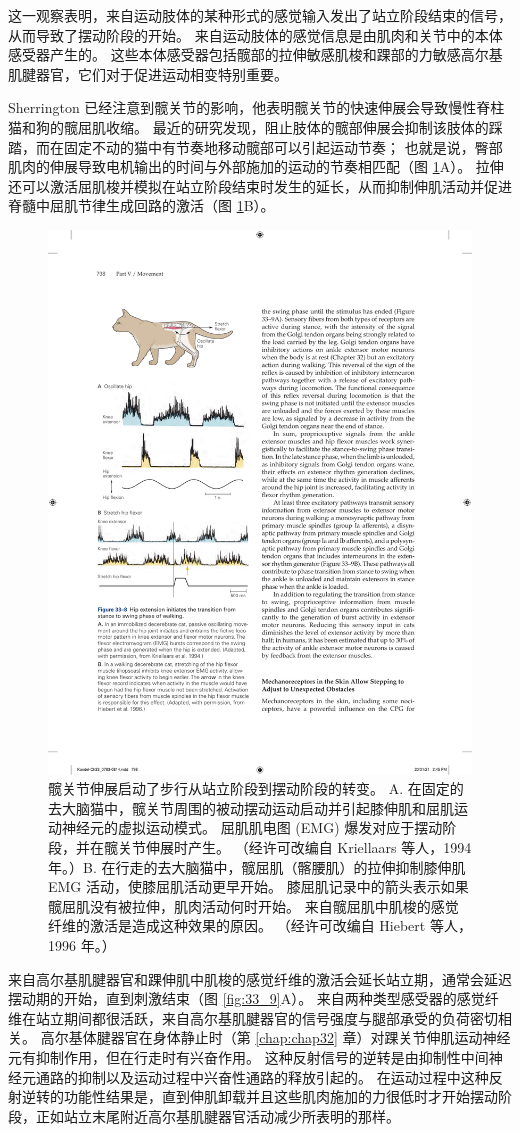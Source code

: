 这一观察表明，来自运动肢体的某种形式的感觉输入发出了站立阶段结束的信号，从而导致了摆动阶段的开始。
来自运动肢体的感觉信息是由肌肉和关节中的本体感受器产生的。
这些本体感受器包括髋部的拉伸敏感肌梭和踝部的力敏感高尔基肌腱器官，它们对于促进运动相变特别重要。


Sherrington 已经注意到髋关节的影响，他表明髋关节的快速伸展会导致慢性脊柱猫和狗的髋屈肌收缩。
最近的研究发现，阻止肢体的髋部伸展会抑制该肢体的踩踏，而在固定不动的猫中有节奏地移动髋部可以引起运动节奏；
也就是说，臀部肌肉的伸展导致电机输出的时间与外部施加的运动的节奏相匹配（图 \ref{fig:33_8}A）。 
拉伸还可以激活屈肌梭并模拟在站立阶段结束时发生的延长，从而抑制伸肌活动并促进脊髓中屈肌节律生成回路的激活（图 \ref{fig:33_8}B）。


\begin{figure}[htbp]
	\centering
	\includegraphics[width=0.5\linewidth]{chap33/fig_33_8}
	\caption{髋关节伸展启动了步行从站立阶段到摆动阶段的转变。 A. 在固定的去大脑猫中，髋关节周围的被动摆动运动启动并引起膝伸肌和屈肌运动神经元的虚拟运动模式。 屈肌肌电图 (EMG) 爆发对应于摆动阶段，并在髋关节伸展时产生。 （经许可改编自 Kriellaars 等人，1994 年。）B. 在行走的去大脑猫中，髋屈肌（髂腰肌）的拉伸抑制膝伸肌 EMG 活动，使膝屈肌活动更早开始。 膝屈肌记录中的箭头表示如果髋屈肌没有被拉伸，肌肉活动何时开始。 来自髋屈肌中肌梭的感觉纤维的激活是造成这种效果的原因。 （经许可改编自 Hiebert 等人，1996 年。）}
	\label{fig:33_8}
\end{figure}


来自高尔基肌腱器官和踝伸肌中肌梭的感觉纤维的激活会延长站立期，通常会延迟摆动期的开始，直到刺激结束（图 \ref{fig:33_9}A）。
来自两种类型感受器的感觉纤维在站立期间都很活跃，来自高尔基肌腱器官的信号强度与腿部承受的负荷密切相关。
高尔基体腱器官在身体静止时（第 \ref{chap:chap32} 章）对踝关节伸肌运动神经元有抑制作用，但在行走时有兴奋作用。
这种反射信号的逆转是由抑制性中间神经元通路的抑制以及运动过程中兴奋性通路的释放引起的。
在运动过程中这种反射逆转的功能性结果是，直到伸肌卸载并且这些肌肉施加的力很低时才开始摆动阶段，正如站立末尾附近高尔基肌腱器官活动减少所表明的那样。


